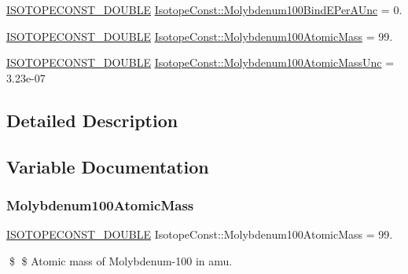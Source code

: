 \begin{DoxyCompactItemize}
\item 
\mbox{\hyperlink{group___isotope_const-_macros_ga8f45a7272ce02c0b4c65c44636ed719a}{I\+S\+O\+T\+O\+P\+E\+C\+O\+N\+S\+T\+\_\+\+D\+O\+U\+B\+LE}} \mbox{\hyperlink{group___isotope_const-_molybdenum-_mo100_ga2d61070e130897c2a5145aa5b622ecc4}{Isotope\+Const\+::\+Molybdenum100\+Bind\+E\+Per\+A\+Unc}} = 0.
\item 
\mbox{\hyperlink{group___isotope_const-_macros_ga8f45a7272ce02c0b4c65c44636ed719a}{I\+S\+O\+T\+O\+P\+E\+C\+O\+N\+S\+T\+\_\+\+D\+O\+U\+B\+LE}} \mbox{\hyperlink{group___isotope_const-_molybdenum-_mo100_ga6fd990fb25c6e18436d39706e00795a7}{Isotope\+Const\+::\+Molybdenum100\+Atomic\+Mass}} = 99.
\item 
\mbox{\hyperlink{group___isotope_const-_macros_ga8f45a7272ce02c0b4c65c44636ed719a}{I\+S\+O\+T\+O\+P\+E\+C\+O\+N\+S\+T\+\_\+\+D\+O\+U\+B\+LE}} \mbox{\hyperlink{group___isotope_const-_molybdenum-_mo100_ga18bdd089d18993550b3885f402f24266}{Isotope\+Const\+::\+Molybdenum100\+Atomic\+Mass\+Unc}} = 3.\+23e-\/07
\end{DoxyCompactItemize}


\subsection{Detailed Description}


\subsection{Variable Documentation}
\mbox{\label{group___isotope_const-_molybdenum-_mo100_ga6fd990fb25c6e18436d39706e00795a7}} 
\subsubsection{\texorpdfstring{Molybdenum100\+Atomic\+Mass}{Molybdenum100AtomicMass}}
{\footnotesize\ttfamily \mbox{\hyperlink{group___isotope_const-_macros_ga8f45a7272ce02c0b4c65c44636ed719a}{I\+S\+O\+T\+O\+P\+E\+C\+O\+N\+S\+T\+\_\+\+D\+O\+U\+B\+LE}} Isotope\+Const\+::\+Molybdenum100\+Atomic\+Mass = 99.}

\$ \$ Atomic mass of Molybdenum-\/100 in amu. \mbox{\label{group___isotope_const-_molybdenum-_mo100_ga18bdd089d18993550b3885f402f24266}} 
